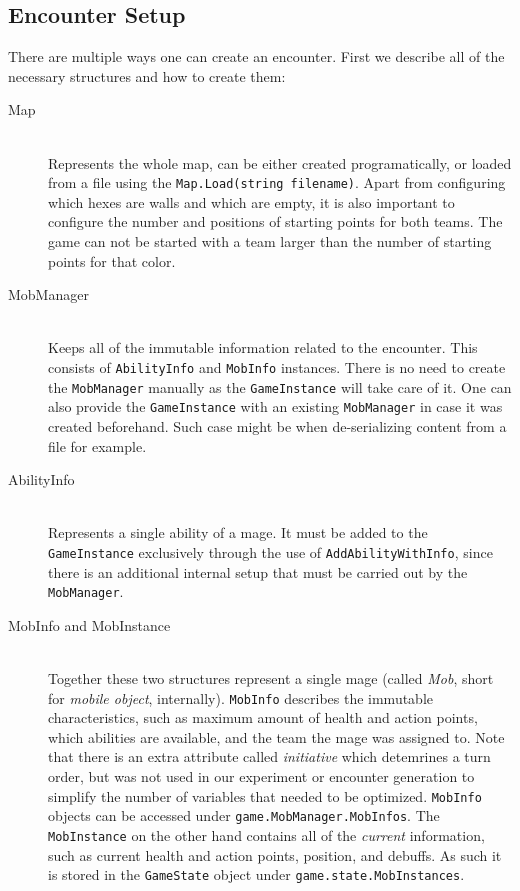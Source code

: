 \subsection{Encounter Setup}

There are multiple ways one can create an encounter. First we describe all of the necessary structures and how to create them:

\begin{description}
	\item[Map] \hfill \\
	Represents the whole map, can be either created programatically, or loaded from a file using the \verb|Map.Load(string filename)|. Apart from configuring which hexes are walls and which are empty, it is also important to configure the number and positions of starting points for both teams. The game can not be started with a team larger than the number of starting points for that color.
	
	\item[MobManager] \hfill \\
	Keeps all of the immutable information related to the encounter. This consists of \verb|AbilityInfo| and \verb|MobInfo| instances. There is no need to create the \verb|MobManager| manually as the \verb|GameInstance| will take care of it. One can also provide the \verb|GameInstance| with an existing \verb|MobManager| in case it was created beforehand. Such case might be when de-serializing content from a file for example.
	
	\item[AbilityInfo] \hfill \\
	Represents a single ability of a mage. It must be added to the \verb|GameInstance| exclusively through the use of \verb|AddAbilityWithInfo|, since there is an additional internal setup that must be carried out by the \verb|MobManager|.
	
	\item[MobInfo and MobInstance] \hfill \\
	Together these two structures represent a single mage (called \emph{Mob}, short for \emph{mobile object}, internally). \verb|MobInfo| describes the immutable characteristics, such as maximum amount of health and action points, which abilities are available, and the team the mage was assigned to. Note that there is an extra attribute called \emph{initiative} which detemrines a turn order, but was not used in our experiment or encounter generation to simplify the number of variables that needed to be optimized. \verb|MobInfo| objects can be accessed under \verb|game.MobManager.MobInfos|. The \verb|MobInstance| on the other hand contains all of the \emph{current} information, such as current health and action points, position, and debuffs. As such it is stored in the \verb|GameState| object under \verb|game.state.MobInstances|.
\end{description}

